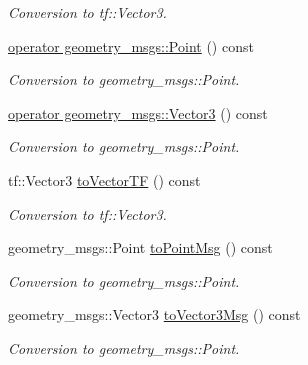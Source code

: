 \begin{DoxyCompactItemize}
\begin{DoxyCompactList}\small\item\em Conversion to tf\+::\+Vector3. \end{DoxyCompactList}\item 
\hyperlink{classow__core_1_1Vector3Ref_a0fa93408729b260afd057080b6acdbeb}{operator geometry\+\_\+msgs\+::\+Point} () const \hypertarget{classow__core_1_1Vector3Ref_a0fa93408729b260afd057080b6acdbeb}{}\label{classow__core_1_1Vector3Ref_a0fa93408729b260afd057080b6acdbeb}

\begin{DoxyCompactList}\small\item\em Conversion to geometry\+\_\+msgs\+::\+Point. \end{DoxyCompactList}\item 
\hyperlink{classow__core_1_1Vector3Ref_a8ada21757d1605bea6abe32b164a8b18}{operator geometry\+\_\+msgs\+::\+Vector3} () const \hypertarget{classow__core_1_1Vector3Ref_a8ada21757d1605bea6abe32b164a8b18}{}\label{classow__core_1_1Vector3Ref_a8ada21757d1605bea6abe32b164a8b18}

\begin{DoxyCompactList}\small\item\em Conversion to geometry\+\_\+msgs\+::\+Point. \end{DoxyCompactList}\item 
tf\+::\+Vector3 \hyperlink{classow__core_1_1Vector3Ref_a19d6773e362b9c1117b43227b82d9d49}{to\+Vector\+TF} () const \hypertarget{classow__core_1_1Vector3Ref_a19d6773e362b9c1117b43227b82d9d49}{}\label{classow__core_1_1Vector3Ref_a19d6773e362b9c1117b43227b82d9d49}

\begin{DoxyCompactList}\small\item\em Conversion to tf\+::\+Vector3. \end{DoxyCompactList}\item 
geometry\+\_\+msgs\+::\+Point \hyperlink{classow__core_1_1Vector3Ref_a6a3676b629ef710c1f626e2c0bb4a683}{to\+Point\+Msg} () const \hypertarget{classow__core_1_1Vector3Ref_a6a3676b629ef710c1f626e2c0bb4a683}{}\label{classow__core_1_1Vector3Ref_a6a3676b629ef710c1f626e2c0bb4a683}

\begin{DoxyCompactList}\small\item\em Conversion to geometry\+\_\+msgs\+::\+Point. \end{DoxyCompactList}\item 
geometry\+\_\+msgs\+::\+Vector3 \hyperlink{classow__core_1_1Vector3Ref_a00dd58af16b78fd7b882d2d253d8e0d4}{to\+Vector3\+Msg} () const \hypertarget{classow__core_1_1Vector3Ref_a00dd58af16b78fd7b882d2d253d8e0d4}{}\label{classow__core_1_1Vector3Ref_a00dd58af16b78fd7b882d2d253d8e0d4}

\begin{DoxyCompactList}\small\item\em Conversion to geometry\+\_\+msgs\+::\+Point. \end{DoxyCompactList}\end{DoxyCompactItemize}


